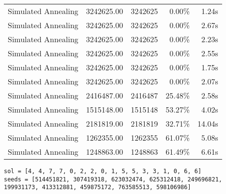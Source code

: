 \begin{table}[ht]
\begin{tabular}{|r|r|r|r|r|}
Simulated Annealing & 3242625.00 & 3242625 & 0.00\% & 1.24s\\
Simulated Annealing & 3242625.00 & 3242625 & 0.00\% & 2.67s\\
Simulated Annealing & 3242625.00 & 3242625 & 0.00\% & 2.23s\\
Simulated Annealing & 3242625.00 & 3242625 & 0.00\% & 2.55s\\
Simulated Annealing & 3242625.00 & 3242625 & 0.00\% & 1.75s\\
Simulated Annealing & 3242625.00 & 3242625 & 0.00\% & 2.07s\\
Simulated Annealing & 2416487.00 & 2416487 & 25.48\% & 2.58s\\
Simulated Annealing & 1515148.00 & 1515148 & 53.27\% & 4.02s\\
Simulated Annealing & 2181819.00 & 2181819 & 32.71\% & 14.04s\\
Simulated Annealing & 1262355.00 & 1262355 & 61.07\% & 5.08s\\
Simulated Annealing & 1248863.00 & 1248863 & 61.49\% & 6.61s\\
\end{tabular}%
\end{table}
\begin{lstlisting}[label={lst:call7vehicle3},caption=Optimal solution call\_7\_vehicle\_3]
sol = [4, 4, 7, 7, 0, 2, 2, 0, 1, 5, 5, 3, 3, 1, 0, 6, 6]
seeds = [514451821, 307419318, 623032474, 625312418, 249696821, 199931173, 413312881, 459875172, 763585513, 598106986]
\end{lstlisting}%
\clearpage


